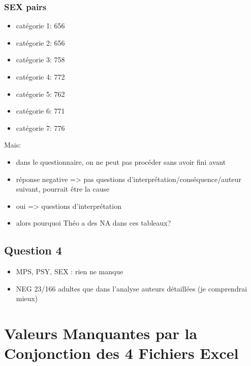 \documentclass[
]{article}
\providecommand{\tightlist}{%
  \setlength{\itemsep}{0pt}\setlength{\parskip}{0pt}}
\begin{document}
\hypertarget{sex-pairs}{%
\subsubsection{SEX pairs}\label{sex-pairs}}

\begin{itemize}
\tightlist
\item
  catégorie 1: 656
\item
  catégorie 2: 656
\item
  catégorie 3: 758
\item
  catégorie 4: 772
\item
  catégorie 5: 762
\item
  catégorie 6: 771
\item
  catégorie 7: 776
\end{itemize}

Mais:

\begin{itemize}
\tightlist
\item
  dans le questionnaire, on ne peut pas procéder sans avoir fini avant
\item
  réponse negative =\textgreater{} pas questions
  d'interprétation/conséquence/auteur suivant, pourrait être la cause
\item
  oui =\textgreater{} questions d'interprétation
\item
  alors pourquoi Théo a des NA dans ces tableaux?
\end{itemize}

\hypertarget{question-4}{%
\subsection{Question 4}\label{question-4}}

\begin{itemize}
\tightlist
\item
  MPS, PSY, SEX : rien ne manque
\item
  NEG 23/166 adultes que dans l'analyse auteurs détaillées (je
  comprendrai mieux)
\end{itemize}

\hypertarget{valeurs-manquantes-par-la-conjonction-des-4-fichiers-excel}{%
\section{Valeurs Manquantes par la Conjonction des 4 Fichiers
Excel}\label{valeurs-manquantes-par-la-conjonction-des-4-fichiers-excel}}
\end{document}
